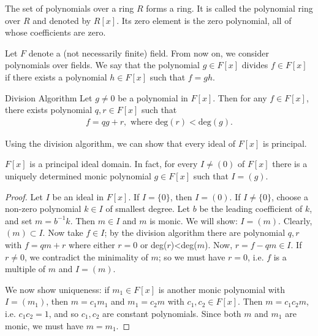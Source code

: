 \begin{theorem}{}{}
    The set of polynomials over a ring $R$ forms a ring.
    It is called the polynomial ring over $R$ and denoted by $R[x]$.
    Its zero element is the zero polynomial, all of whose coefficients are zero. 
\end{theorem}

Let $F$ denote a (not necessarily finite) field. 
From now on, we consider polynomials over fields.
We say that the polynomial $g \in F[x]$ divides $f \in F[x]$
if there exists a polynomial $h \in F[x]$ such that $f = gh$.

\begin{theorem}{Division Algorithm}{}
    Let $g\neq 0$ be a polynomial in $F[x]$.
    Then for any $f\in F[x]$, there exists polynomial $q,r\in F[x]$
    such that
    \begin{align*}
        f=qg+r, \text{ where } \text{deg}(r)<\text{deg}(g).
    \end{align*}
\end{theorem}

Using the division algorithm, we can show that every ideal of $F[x]$ is principal.

\begin{proposition}{}{}
    $F[x]$ is a principal ideal domain. In fact,
    for every $I\neq (0)$ of $F[x]$ there is a uniquely determined monic polynomial 
    $g\in F[x]$ such that $I=(g)$.
\end{proposition}

\begin{proof}
    Let $I$ be an ideal in $F[x]$. If $I=\{0\}$, then $I=(0)$.
    If $I\neq \{0\}$, choose a non-zero polynomial $k\in I$ of smallest degree.
    Let $b$ be the leading coefficient of $k$, and set $m=b^{-1}k$.
    Then $m\in I$ and $m$ is monic. We will show: $I=(m)$.
    Clearly, $(m)\subset I$. Now take $f\in I$;
    by the division algorithm there are polynomial $q,r$ with $f=qm+r$ where 
    either $r=0$ or deg($r$)<deg($m$). Now, $r=f-qm\in I$.
    If $r\neq 0$, we contradict the minimality of $m$;
    so we must have $r=0$, i.e. $f$ is a multiple of $m$ and $I=(m)$.\\
    \par
    We now show uniqueness: if $m_1\in F[x]$ is another monic polynomial with $I=(m_1)$,
    then $m=c_1m_1$ and $m_1=c_2m$ with $c_1,c_2\in F[x]$. Then $m=c_1c_2m$, i.e. $c_1c_2=1$, 
    and so $c_1,c_2$ are constant polynomials.
    Since both $m$ and $m_1$ are monic, we must have $m=m_1$.
\end{proof}

